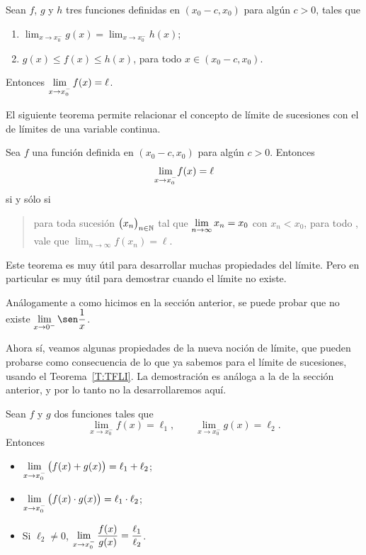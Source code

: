 \begin{theorem}
    Sean $f$, $g$ y $h$ tres funciones definidas en $(x_0-c,x_0)$ para algún $c>0$, tales que
    \begin{enumerate}
        \item $\lim_{x\to x_0^-} g(x) = \lim_{x\to x_0^-} h(x)$;
        \item $g(x)\le f(x) \le h(x)$, para todo $x\in(x_0-c,x_0)$.
    \end{enumerate}
    Entonces $\displaystyle \lim_{x\to x_0^-} f(x)=\ell$.
\end{theorem}


El siguiente teorema permite relacionar el concepto de límite de sucesiones con el de límites de una variable continua.

\begin{theorem}\label{T:TFLI}
Sea $f$ una función definida en $(x_0-c,x_0)$ para algún $c>0$.
Entonces 
\[ \displaystyle {\ensuremath{\lim_{x\to x_0^-}}} f(x)=\ell
\]
si y sólo si 
\begin{quote}
    para toda sucesión $\big(x_n\big)_{n\in\mathbb{N}}$ tal que $\displaystyle\lim_{n\to\infty} x_n = x_0$ con $x_n < x_0$, para todo \niN, vale que $\lim_{n\to\infty}f(x_n)=\ell$.
\end{quote}
\end{theorem}

Este teorema es muy útil para desarrollar muchas propiedades del límite. Pero en particular es muy útil para demostrar cuando el límite no existe.

\begin{example}
    Análogamente a como hicimos en la sección anterior, se puede probar que no existe $\D\lim_{x\to 0^-} \sen \frac1x$.
\end{example}

Ahora sí, veamos algunas propiedades de la nueva noción de límite, que pueden probarse como consecuencia de lo que ya sabemos para el límite de sucesiones, usando el Teorema~\ref{T:TFLI}. La demostración es análoga a la de la sección anterior, y por lo tanto no la desarrollaremos aquí.

\begin{proposition}
    Sean $f$ y $g$ dos funciones tales que
    \[
    \lim_{x\to x_0^-} f(x)=\ell_1,
    \qquad
    \lim_{x\to x_0^-} g(x)=\ell_2.
    \]
    Entonces
    \begin{itemize}
        \item $\displaystyle \lim_{x\to x_0^-} \big( f(x) + g(x) \big) = \ell_1 + \ell_2$;
        \item $\displaystyle \lim_{x\to x_0^-} \big( f(x) \cdot g(x) \big) = \ell_1 \cdot \ell_2$;
        \item Si $\ell_2\neq 0$, $\displaystyle \lim_{x\to x_0^-} \frac{f(x)}{g(x)} = \frac{\ell_1}{\ell_2}$.
    \end{itemize}
\end{proposition}


